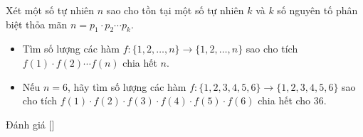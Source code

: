 \ifshowproblem
\begin{problem}\label{problem:ROU-2015-MO-10-P2}
    Xét một số tự nhiên \( n \) sao cho tồn tại một số tự nhiên \( k \) và \( k \) số nguyên tố phân biệt thỏa mãn \( n = p_1 \cdot p_2 \cdots p_k \).

    \begin{itemize}[topsep=0pt, partopsep=0pt, itemsep=0pt]
        \item Tìm số lượng các hàm \( f:\{1, 2, \ldots, n\} \longrightarrow \{1, 2, \ldots, n\} \) 
        sao cho tích \( f(1) \cdot f(2) \cdots f(n) \) chia hết \( n \).
        \item Nếu \( n = 6 \), hãy tìm số lượng các hàm \( f:\{1, 2, 3, 4, 5, 6\} \longrightarrow \{1, 2, 3, 4, 5, 6\} \) 
        sao cho tích \( f(1)\cdot f(2)\cdot f(3)\cdot f(4)\cdot f(5)\cdot f(6) \) chia hết cho \( 36 \).
    \end{itemize}    
\end{problem}
\fi

\ifshowinfo
Đánh giá [\textbf{}]\footnotemark
{}
\fi